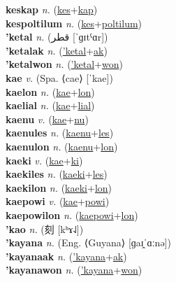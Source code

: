\textbf{keskap} \textit{n.} (\hyperref[kes]{kes}+\hyperref[kap]{kap})
 \label{keskap} \\
\textbf{kespoltilum} \textit{n.} (\hyperref[kes]{kes}+\hyperref[poltilum]{poltilum})
 \label{kespoltilum} \\
\textbf{'ketal} \textit{n.} ({\arabics{}قطر‎} [ˈɡɪtˤɑr])
 \label{'ketal} \\
\textbf{'ketalak} \textit{n.} (\hyperref['ketal]{'ketal}+\hyperref[ak]{ak})
 \label{'ketalak} \\
\textbf{'ketalwon} \textit{n.} (\hyperref['ketal]{'ketal}+\hyperref[won]{won})
 \label{'ketalwon} \\
\textbf{kae} \textit{v.} (Spa. ⟨cae⟩ [ˈkae])
 \label{kae} \\
\textbf{kaelon} \textit{n.} (\hyperref[kae]{kae}+\hyperref[lon]{lon})
 \label{kaelon} \\
\textbf{kaelial} \textit{n.} (\hyperref[kae]{kae}+\hyperref[lial]{lial})
 \label{kaelial} \\
\textbf{kaenu} \textit{v.} (\hyperref[kae]{kae}+\hyperref[nu]{nu})
 \label{kaenu} \\
\textbf{kaenules} \textit{n.} (\hyperref[kaenu]{kaenu}+\hyperref[les]{les})
 \label{kaenules} \\
\textbf{kaenulon} \textit{n.} (\hyperref[kaenu]{kaenu}+\hyperref[lon]{lon})
 \label{kaenulon} \\
\textbf{kaeki} \textit{v.} (\hyperref[kae]{kae}+\hyperref[ki]{ki})
 \label{kaeki} \\
\textbf{kaekiles} \textit{n.} (\hyperref[kaeki]{kaeki}+\hyperref[les]{les})
 \label{kaekiles} \\
\textbf{kaekilon} \textit{n.} (\hyperref[kaeki]{kaeki}+\hyperref[lon]{lon})
 \label{kaekilon} \\
\textbf{kaepowi} \textit{v.} (\hyperref[kae]{kae}+\hyperref[powi]{powi})
 \label{kaepowi} \\
\textbf{kaepowilon} \textit{n.} (\hyperref[kaepowi]{kaepowi}+\hyperref[lon]{lon})
 \label{kaepowilon} \\
\textbf{'kao} \textit{n.} ({\chinese{}刻} [kʰɤ˨˩])
 \label{'kao} \\
\textbf{'kayana} \textit{n.} (Eng. ⟨Guyana⟩ [ɡaɪ̯ˈɑːnə])
 \label{'kayana} \\
\textbf{'kayanaak} \textit{n.} (\hyperref['kayana]{'kayana}+\hyperref[ak]{ak})
 \label{'kayanaak} \\
\textbf{'kayanawon} \textit{n.} (\hyperref['kayana]{'kayana}+\hyperref[won]{won})
 \label{'kayanawon} \\
